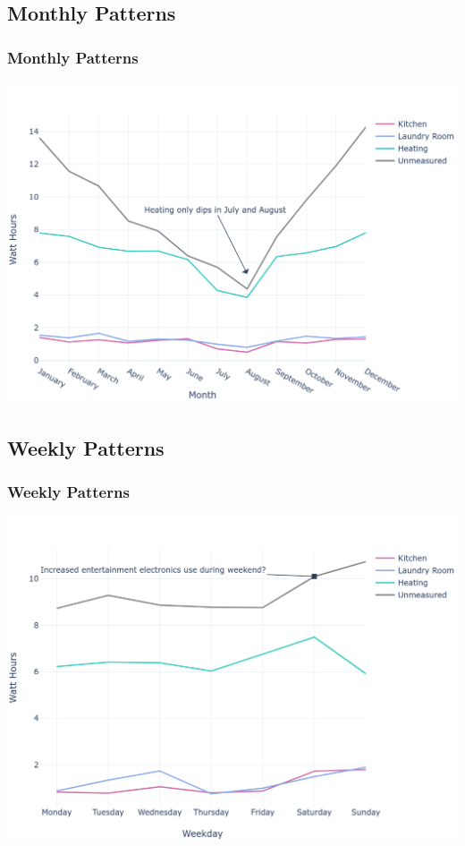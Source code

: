 \documentclass[10pt]{beamer}
\begin{document}
\subsection{Monthly Patterns}

\begin{frame}
\frametitle{Monthly Patterns}

\bigskip
{
    \centering
    \includegraphics[width=\textwidth,height=\textheight,keepaspectratio]{monthly_seasonality.png}
    \par
}
\bigskip

\end{frame}

\subsection{Weekly Patterns}

\begin{frame}
\frametitle{Weekly Patterns}

\bigskip
{
    \centering
    \includegraphics[width=\textwidth,height=\textheight,keepaspectratio]{weekly_seasonality.png}
    \par
}
\bigskip

\end{frame}
\end{document}
